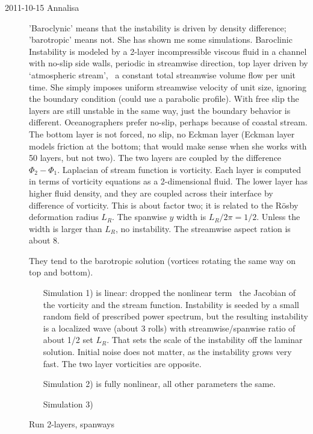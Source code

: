 \begin{description}
\item[2011-10-15 Annalisa]
'Baroclynic' means that the instability is driven by density
difference; 'barotropic' means not.
She has shown me some simulations.
Baroclinic Instability is modeled by a 2-layer incompressible
viscous fluid in a channel with
no-slip side walls, periodic in streamwise direction, top layer
driven by
`atmospheric stream', \ie\ a constant total streamwise volume flow per unit
time. She simply imposes uniform streamwise velocity of unit size,
ignoring the boundary condition (could use a parabolic profile).
With free slip the layers are still unstable in the same way,
just the boundary behavior is different. Oceanographers prefer no-slip,
perhaps because of coastal stream.
The bottom layer is not forced, no slip, no Eckman layer
(Eckman layer models friction at the bottom; that would make sense when she works
with 50 layers, but not two).
The two layers are coupled by the difference $\Phi_2 - \Phi_1$.
Laplacian of stream function is vorticity.
Each layer is computed in terms of vorticity equations as a 2-dimensional
fluid. The lower layer has higher fluid density, and they are coupled
across their interface by difference of vorticity. This is about factor
two; it is related to the
R\"osby deformation radius $L_R$. The spanwise $y$ width is $L_R/2\pi = 1/2$.
Unless the width is larger than $L_R$, no instability. The streamwise
aspect ration is about 8.

They tend to the barotropic solution (vortices rotating the same way on
top and bottom).

\begin{enumerate}
  \item [Simulation 1)]
is linear: dropped the nonlinear term \ie\ the Jacobian of the vorticity
and the stream function. Instability is seeded by a small random field of
prescribed power spectrum, but the resulting instability is a localized
wave (about 3 rolls) with streamwise/spanwise ratio of about 1/2 set
$L_R$. That sets the scale of the instability off the laminar solution.
Initial noise does not matter, as the instability grows very fast. The
two layer vorticities are opposite.
  \item [Simulation 2)] is fully nonlinear, all other parameters the same.

  \item [Simulation 3)]
\end{enumerate}

Run 2-layers, spanways

\end{description}
